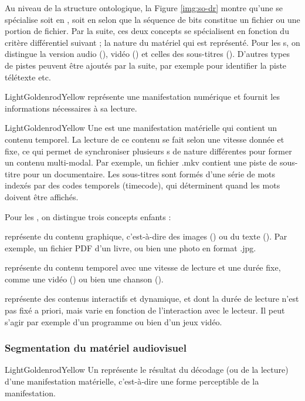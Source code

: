Au niveau de la structure ontologique, la Figure \ref{img:so-dr} montre qu'une  se spécialise soit en , soit en  selon que la séquence de bits constitue un fichier ou une portion de fichier.
Par la suite, ces deux concepts se spécialisent en fonction du critère différentiel suivant ; la nature du matériel qui est représenté. 
Pour les s, on distingue la version audio (), vidéo () et celles des sous-titres ().
D'autres types de pistes peuvent être ajoutés par la suite, par exemple pour identifier la piste télétexte etc.
\begin{cadrecol}{LightGoldenrodYellow}
 représente une manifestation numérique et fournit les informations nécessaires à sa lecture.
\end{cadrecol}
\begin{cadrecol}{LightGoldenrodYellow}
Une  est une manifestation matérielle qui contient un contenu temporel. 
La lecture de ce contenu se fait selon une vitesse donnée et fixe, ce qui permet de synchroniser plusieurs s de nature différentes pour former un contenu multi-modal. 
Par exemple, un fichier .mkv contient une piste de sous-titre pour un documentaire. 
Les sous-titres sont formés d'une série de mots indexés par des codes temporels (timecode), qui déterminent quand les mots doivent être affichés. 
\end{cadrecol}

Pour les , on distingue trois concepts enfants : 
\begin{liste}
	\item {} représente du contenu graphique, c'est-à-dire des images () ou du texte (). 
	Par exemple, un fichier PDF d'un livre, ou bien une photo en format .jpg.
	\item {} représente du contenu temporel avec une vitesse de lecture et une durée fixe, comme une vidéo () ou bien une chanson ().
	\item {} représente des contenus interactifs et dynamique, et dont la durée de lecture n'est pas fixé a priori, mais varie en fonction de l'interaction avec le lecteur.
	Il peut s'agir par exemple d'un programme ou bien d'un jeux vidéo. 
\end{liste}


\subsubsection*{Segmentation du matériel audiovisuel}
\begin{cadrecol}{LightGoldenrodYellow}
Un  représente le résultat du décodage (ou de la lecture) d'une manifestation matérielle, c'est-à-dire une forme perceptible de la manifestation.
\end{cadrecol}



